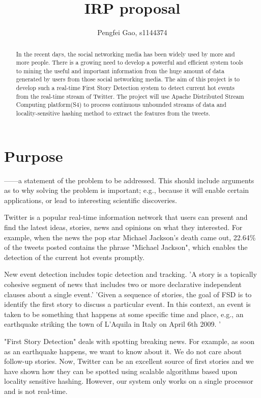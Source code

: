 \documentclass[a4paper,12pt]{article}
\title{IRP proposal}
\author{Pengfei Gao, s1144374}
\begin{document}
\maketitle

\begin{abstract}

In the recent days, the social networking media has been widely used by more and more people. There is a growing need to develop a powerful and efficient system tools to mining the useful and important information from the huge amount of data generated by users from those social networking media. The aim of this project is to develop such a real-time First Story Detection system to detect current hot events from the real-time stream of Twitter. The project will use Apache Distributed Stream Computing platform(S4) to process continuous unbounded streams of data and locality-sensitive hashing method to extract the features from the tweets.

\end{abstract}



\section{Purpose}

------a statement of the problem to be addressed. This should include arguments as to why solving the problem is important; e.g., because it will enable certain applications, or lead to interesting scientific discoveries.


Twitter is a popular real-time information network that users can present and find the latest ideas, stories, news and opinions on what they interested. For example, when the news the pop star Michael Jackson's death came out, 22.64\% of the tweets posted contains the phrase "Michael Jackson", which enables the detection of the current hot events promptly. 


New event detection includes topic detection and tracking. 
'A story is a topically cohesive segment of news that includes two or more declarative independent clauses about a single event.'
'Given a sequence of stories, the goal of FSD is to identify the ﬁrst story to discuss a particular event. In this context, an event is taken to be something that happens at some specific time and place, e.g., an earthquake striking the town of L’Aquila in Italy on April 6th 2009. '



 "First Story Detection" deals with spotting breaking news. For example, as soon as an earthquake happens, we want to know about it. We do not care about follow-up stories. Now, Twitter can be an excellent source of first stories and we have shown how they can be spotted using scalable algorithms based upon locality sensitive hashing. However, our system only works on a single processor and is not real-time.
\end{document}

